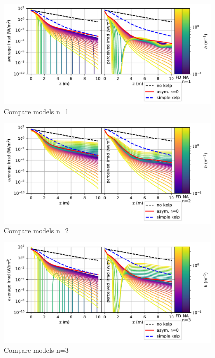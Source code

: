 \documentclass[ms,cpyr,lof,lot]{uathesis}
\begin{document}
\begin{figure}[H]
  \centering
  \includegraphics[width=6in]{compare_models_n1}
  \caption{Compare models n=1}
  \label{fig:compare_models_n1}
\end{figure}
\begin{figure}[H]
  \centering
  \includegraphics[width=6in]{compare_models_n2}
  \caption{Compare models n=2}
  \label{fig:compare_models_n2}
\end{figure}
\begin{figure}[H]
  \centering
  \includegraphics[width=6in]{compare_models_n3}
  \caption{Compare models n=3}
  \label{fig:compare_models_n3}
\end{figure}
\end{document}
